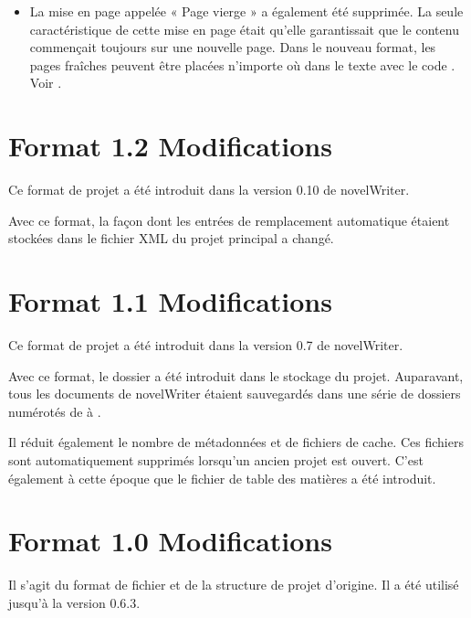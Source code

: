 \documentclass[a4paper,11pt,french]{sphinxmanual}
\begin{document}
\sphinxAtStartPar
{}
\begin{itemize}
\item {} 
\sphinxAtStartPar
La mise en page appelée « Page vierge » a également été supprimée. La seule caractéristique de cette mise en page était qu’elle garantissait que le contenu commençait toujours sur une nouvelle page. Dans le nouveau format, les pages fraîches peuvent être placées n’importe où dans le texte avec le code . Voir {\hyperref[\detokenize{usage_format:a-fmt-break}]{}}.

\end{itemize}


\section{Format 1.2 Modifications}
\label{\detokenize{more_projectformat:format-1-2-changes}}\label{\detokenize{more_projectformat:a-prjfmt-1-2}}
\sphinxAtStartPar
Ce format de projet a été introduit dans la version 0.10 de novelWriter.

\sphinxAtStartPar
Avec ce format, la façon dont les entrées de remplacement automatique étaient stockées dans le fichier XML du projet principal a changé.


\section{Format 1.1 Modifications}
\label{\detokenize{more_projectformat:format-1-1-changes}}\label{\detokenize{more_projectformat:a-prjfmt-1-1}}
\sphinxAtStartPar
Ce format de projet a été introduit dans la version 0.7 de novelWriter.

\sphinxAtStartPar
Avec ce format, le dossier  a été introduit dans le stockage du projet. Auparavant, tous les documents de novelWriter étaient sauvegardés dans une série de dossiers numérotés de  à .

\sphinxAtStartPar
Il réduit également le nombre de métadonnées et de fichiers de cache. Ces fichiers sont automatiquement supprimés lorsqu’un ancien projet est ouvert. C’est également à cette époque que le fichier de table des matières a été introduit.


\section{Format 1.0 Modifications}
\label{\detokenize{more_projectformat:format-1-0-changes}}\label{\detokenize{more_projectformat:a-prjfmt-1-0}}
\sphinxAtStartPar
Il s’agit du format de fichier et de la structure de projet d’origine. Il a été utilisé jusqu’à la version 0.6.3.
\end{document}
